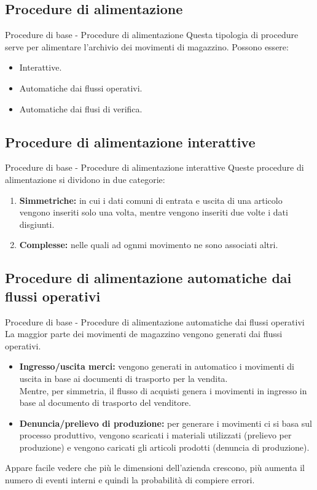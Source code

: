 \documentclass{beamer}
\begin{document}
\subsection{Procedure di alimentazione}
\begin{frame}{Procedure di base - Procedure di alimentazione}
    Questa tipologia di procedure serve per alimentare l'archivio dei movimenti di magazzino.
    Possono essere:
    \begin{itemize}
        \item Interattive.
        \item Automatiche dai flussi operativi.
        \item Automatiche dai flusi di verifica.
    \end{itemize}
\end{frame}

\subsection{Procedure di alimentazione interattive}
\begin{frame}{Procedure di base - Procedure di alimentazione interattive}
    Queste procedure di alimentazione si dividono in due categorie:
    \begin{enumerate}
        \item \textbf{Simmetriche:} in cui i dati comuni di entrata e uscita di una articolo vengono inseriti solo una volta, mentre vengono inseriti due volte i dati disgiunti.
        \item \textbf{Complesse:} nelle quali ad ognmi movimento ne sono associati altri.
    \end{enumerate}
\end{frame}

\subsection{Procedure di alimentazione automatiche dai flussi operativi}
\begin{frame}{Procedure di base - Procedure di alimentazione automatiche dai flussi operativi}
    La maggior parte dei movimenti de magazzino vengono generati dai flussi operativi.
    \begin{itemize}
        \item \textbf{Ingresso/uscita merci:} vengono generati in automatico i movimenti di uscita in base ai documenti di trasporto per la vendita.\\
            Mentre, per simmetria, il flusso di acquisti genera i movimenti in ingresso in base al documento di trasporto del venditore.
        \item \textbf{Denuncia/prelievo di produzione:} per generare i movimenti ci si basa sul processo produttivo, vengono scaricati i materiali utilizzati (prelievo per produzione) e vengono caricati gli articoli prodotti (denuncia di produzione).
    \end{itemize}
    Appare facile vedere che più le dimensioni dell'azienda crescono, più aumenta il numero di eventi interni e quindi la probabilità di compiere errori.
\end{frame}
\end{document}
